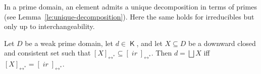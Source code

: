 \documentclass[conference]{IEEEtran}
\newcommand{\compact}[1]{\ensuremath{\mathop{\mathsf{K}({#1})}}}
\newcommand{\ir}[1]{\ensuremath{\mathop{\mathit{ir}({#1})}}}
\newcommand{\eqclass}[2][]{\ensuremath{[{#2}]_{\scriptscriptstyle {#1}}}}
\newcommand{\eqclassir}[1]{\ensuremath{\eqclass[\leftrightarrow^*]{#1}}}
\begin{document}
In a prime domain, an element admits a unique decomposition in
terms of primes (see Lemma~\ref{le:unique-decomposition}). Here the
same holds for irreducibles but only up to interchangeability. 



\begin{proposition}
  \label{pr:unique-dec}
  Let $D$ be a weak prime domain, let $d \in \compact{D}$, and let
  $X \subseteq D$ be a downward closed and consistent set such that
  $\eqclassir{X} \subseteq \eqclassir{\ir{d}}$. Then $d = \bigsqcup X$
  iff $\eqclassir{X} = \eqclassir{\ir{d}}$.
\end{proposition}
\end{document}
